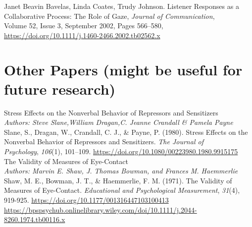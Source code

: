 \documentclass[12pt]{article}
\begin{document}
\noindent Janet Beavin Bavelas, Linda Coates, Trudy Johnson. Listener Responses as a Collaborative Process: The Role of Gaze, \textit{Journal of Communication},\\Volume 52, Issue 3, September 2002, Pages 566–580, \\\href{https://doi.org/10.1111/j.1460-2466.2002.tb02562.x}{https://doi.org/10.1111/j.1460-2466.2002.tb02562.x}\\

\section*{Other Papers (might be useful for\\future research)}
Stress Effects on the Nonverbal Behavior of Repressors and Sensitizers\\
\textit{Authors: Steve Slane,William Dragan,C. Jeanne Crandall \& Pamela Payne}\\

\noindent Slane, S., Dragan, W., Crandall, C. J., \& Payne, P. (1980). Stress Effects on the Nonverbal Behavior of Repressors and Sensitizers. \textit{The Journal of\\Psychology}, \textit{106}(1), 101–109. \href{https://doi.org/10.1080/00223980.1980.9915175}{https://doi.org/10.1080/00223980.1980.9915175}\\

\noindent The Validity of Measures of Eye-Contact\\
\textit{Authors: Marvin E. Shaw, J. Thomas Bowman, and Frances M. Haemmerlie}\\

\noindent Shaw, M. E., Bowman, J. T., \& Haemmerlie, F. M. (1971). The Validity of Measures of Eye-Contact. \textit{Educational and Psychological Measurement}, \textit{31}(4), 919-925. \href{Shaw, M. E., Bowman, J. T., & Haemmerlie, F. M. (1971). The Validity of Measures of Eye-Contact. Educational and Psychological Measurement, 31(4), 919-925. https://doi.org/10.1177/001316447103100413}{https://doi.org/10.1177/001316447103100413}\\

\noindent \href{https://bpspsychub.onlinelibrary.wiley.com/doi/10.1111/j.2044-8260.1974.tb00116.x}{https://bpspsychub.onlinelibrary.wiley.com/doi/10.1111/j.2044-8260.1974.tb00116.x}\\
\end{document}
